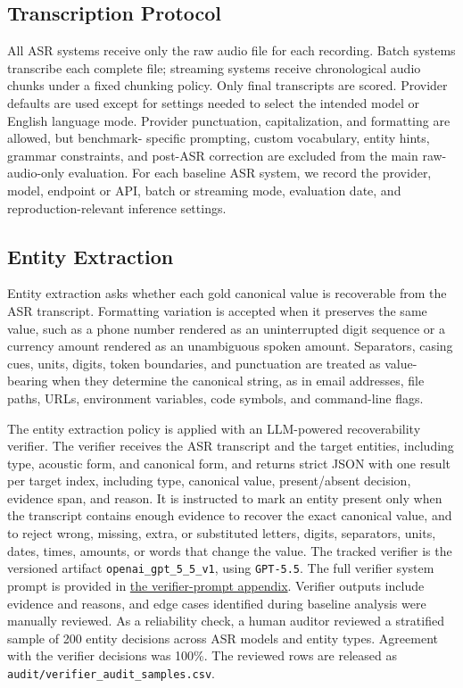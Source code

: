 \documentclass[10pt,twocolumn]{article}
\begin{document}
\subsection{Transcription Protocol}\label{transcription-protocol}

All ASR systems receive only the raw audio file for each
recording. Batch systems transcribe each complete file; streaming systems
receive chronological audio chunks under a fixed chunking policy. Only final
transcripts are scored. Provider defaults are used except for settings
needed to select the intended model or English language mode. Provider
punctuation, capitalization, and formatting are allowed, but benchmark-
specific prompting, custom vocabulary, entity hints, grammar constraints,
and post-ASR correction are excluded from the main raw-audio-only evaluation.
For each baseline ASR system, we record the provider, model, endpoint or API, batch or
streaming mode, evaluation date, and reproduction-relevant inference settings.

\subsection{Entity Extraction}\label{entity-extraction}

Entity extraction asks whether each gold canonical value is recoverable
from the ASR transcript. Formatting variation is accepted when it preserves 
the same value, such as a phone number rendered as an uninterrupted digit 
sequence or a currency amount rendered as an unambiguous spoken amount. 
Separators, casing cues, units, digits, token boundaries, and punctuation are 
treated as value-bearing when they determine the canonical string, as in email 
addresses, file paths, URLs, environment variables, code symbols, and command-line 
flags.

The entity extraction policy is applied with an LLM-powered recoverability
verifier. The verifier receives the ASR transcript and the target entities,
including type, acoustic form, and canonical form, and returns strict JSON
with one result per target index, including type, canonical value, present/absent 
decision, evidence span, and reason. It is instructed to mark an entity
present only when the transcript contains enough evidence to recover the exact
canonical value, and to reject wrong, missing, extra, or substituted letters,
digits, separators, units, dates, times, amounts, or words that change the
value. The tracked verifier is the versioned artifact
\texttt{openai\_gpt\_5\_5\_v1}, using \texttt{GPT-5.5}. The full verifier
system prompt is provided in
\hyperref[appendix-verifier-prompt]{the verifier-prompt appendix}. Verifier
outputs include evidence and reasons, and edge cases
identified during baseline analysis were manually reviewed. As a reliability
check, a human auditor reviewed a stratified sample of 200 entity decisions
across ASR models and entity types. Agreement with the verifier decisions was
100\%. The reviewed rows are released as
\texttt{audit/verifier\_audit\_samples.csv}.
\end{document}
